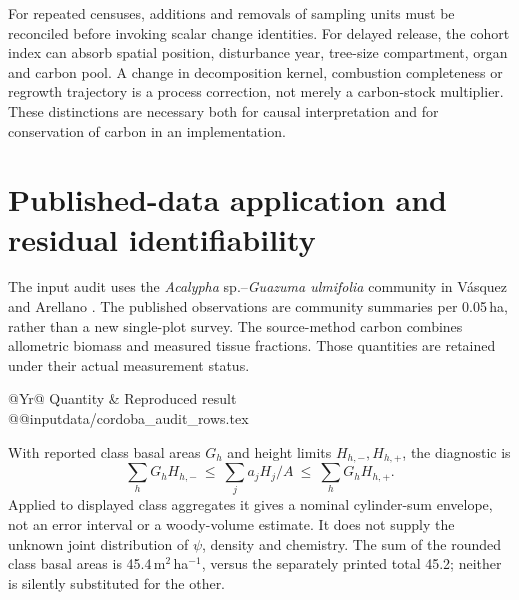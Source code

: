\documentclass[11pt,a4paper]{article}
\theoremstyle{remark}
\begin{document}
For repeated censuses, additions and removals of sampling units must be reconciled before invoking scalar change identities. For delayed release, the cohort index can absorb spatial position, disturbance year, tree-size compartment, organ and carbon pool. A change in decomposition kernel, combustion completeness or regrowth trajectory is a process correction, not merely a carbon-stock multiplier. These distinctions are necessary both for causal interpretation and for conservation of carbon in an implementation.

\section{Published-data application and residual identifiability}\label{app:empirical}
The input audit uses the \textit{Acalypha} sp.--\textit{Guazuma ulmifolia} community in V\'asquez and Arellano \citep[Table~170, p.~942]{Vasquez2012}. The published observations are community summaries per 0.05\,ha, rather than a new single-plot survey. The source-method carbon combines allometric biomass and measured tissue fractions. Those quantities are retained under their actual measurement status.

\begin{table}[htbp]\centering\small
\caption{Worked audit of real published C\'ordoba aggregates. Per-hectare results divide source totals by 0.05\,ha. Class height ranges bound the basal-area--height cylinder sum from displayed inputs; the sum is not solid woody volume. Minor aggregate differences follow displayed precision.}
\label{tab:cordobaaudit}
\begin{tabularx}{\textwidth}{@{}Yr@{}}\toprule
Quantity & Reproduced result\\\midrule
\csname @@input\endcsname data/cordoba_audit_rows.tex
\bottomrule\end{tabularx}\end{table}

With reported class basal areas $G_h$ and height limits $H_{h,-},H_{h,+}$, the diagnostic is
\[
 \sum_hG_hH_{h,-}\ \leq\ \sum_j a_jH_j/A\ \leq\ \sum_hG_hH_{h,+}.
\]
Applied to displayed class aggregates it gives a nominal cylinder-sum envelope, not an error interval or a woody-volume estimate. It does not supply the unknown joint distribution of $\psi$, density and chemistry. The sum of the rounded class basal areas is 45.4\,m$^2$\,ha$^{-1}$, versus the separately printed total 45.2; neither is silently substituted for the other.
\end{document}

